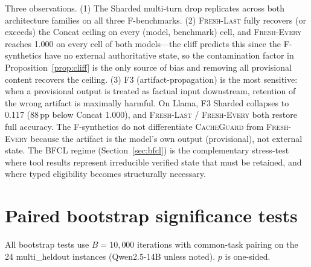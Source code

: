 \documentclass{article}
\begin{document}
Three observations. (1) The Sharded multi-turn drop replicates across both architecture families on all three F-benchmarks. (2) \textsc{Fresh-Last} fully recovers (or exceeds) the Concat ceiling on every (model, benchmark) cell, and \textsc{Fresh-Every} reaches 1.000 on every cell of both models---the cliff predicts this since the F-synthetics have no external authoritative state, so the contamination factor in Proposition~\ref{prop:cliff} is the only source of bias and removing all provisional content recovers the ceiling. (3) F3 (artifact-propagation) is the most sensitive: when a provisional output is treated as factual input downstream, retention of the wrong artifact is maximally harmful. On Llama, F3 Sharded collapses to 0.117 (88\,pp below Concat 1.000), and \textsc{Fresh-Last} / \textsc{Fresh-Every} both restore full accuracy. The F-synthetics do not differentiate \textsc{CacheGuard} from \textsc{Fresh-Every} because the artifact is the model's own output (provisional), not external state. The BFCL regime (Section~\ref{sec:bfcl}) is the complementary stress-test where tool results represent irreducible verified state that must be retained, and where typed eligibility becomes structurally necessary.

\section{Paired bootstrap significance tests}
\label{app:stats}

All bootstrap tests use $B=10{,}000$ iterations with common-task pairing on the 24 multi\_heldout instances (Qwen2.5-14B unless noted). $p$ is one-sided.
\end{document}

